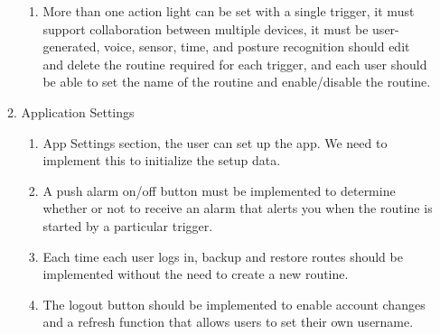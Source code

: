 \documentclass[11pt, conference]{IEEEtran}
\begin{document}
\begin{enumerate}[label=\arabic*.]
\begin{enumerate}[label*={\arabic*.}]
\begin{enumerate}[label*={\arabic*.},ref=\theenumi.\arabic*]
            \item More than one action light can be set with a single trigger, it must support collaboration between multiple devices, it must be user-generated, voice, sensor, time, and posture recognition should edit and delete the routine required for each trigger, and each user should be able to set the name of the routine and enable/disable the routine.\\
    \end{enumerate}

    \item {\large{Application Settings}}\\
    \begin{enumerate}[label*={\arabic*.},ref=\theenumi.\arabic*]
    \setlength{\itemindent}{0.5cm}
        \item App Settings section, the user can set up the app. We need to implement this to initialize the setup data.\\

        \item A push alarm on/off button must be implemented to determine whether or not to receive an alarm that alerts you when the routine is started by a particular trigger.\\

        \item Each time each user logs in, backup and restore routes should be implemented without the need to create a new routine.\\

        \item The logout button should be implemented to enable account changes and a refresh function that allows users to set their own username.\\
    \end{enumerate}
\end{enumerate}


\end{enumerate}
\end{document}
